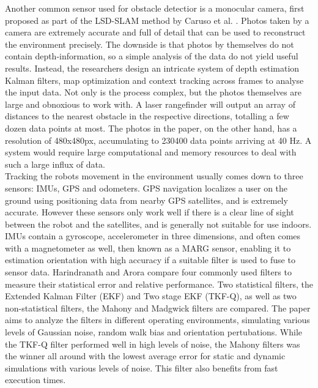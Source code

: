 Another common sensor used for obstacle detectior is a monocular camera, first proposed as part of the LSD-SLAM method by Caruso et al. \cite{7353366}. Photos taken by a camera are extremely accurate and full of detail that can be used to reconstruct the environment precisely. The downside is that photos by themselves do not contain depth-information, so a simple analysis of the data do not yield useful results. Instead, the researchers design an intricate system of depth estimation Kalman filters, map optimization and context tracking across frames to analyse the input data. Not only is the process complex, but the photos themselves are large and obnoxious to work with. A laser rangefinder will output an array of distances to the nearest obstacle in the respective directions, totalling a few dozen data points at most. The photos in the paper, on the other hand, has a resolution of 480x480px, accumulating to 230400 data points arriving at 40 Hz. A system would require large computational and memory resources to deal with such a large influx of data. \\

Tracking the robots movement in the environment usually comes down to three sensors: IMUs, GPS and odometers. GPS navigation localizes a user on the ground using positioning data from nearby GPS satellites, and is extremely accurate. However these sensors only work well if there is a clear line of sight between the robot and the satellites, and is generally not suitable for use indoors. \\

IMUs contain a gyroscope, accelerometer in three dimensions, and often comes with a magnetometer as well, then known as a MARG sensor, enabling it to estimation orientation with high accuracy if a suitable filter is used to fuse to sensor data. Harindranath and Arora \cite{8904029} compare four commonly used filters to measure their statistical error and relative performance. Two statistical filters, the Extended Kalman Filter (EKF) and Two stage EKF (TKF-Q), as well as two non-statistical filters, the Mahony and Madgwick filters are compared. The paper aims to analyze the filters in different operating environments, simulating various levels of Gaussian noise, random walk bias and orientation pertubations. While the TKF-Q filter performed well in high levels of noise, the Mahony filters was the winner all around with the lowest average error for static and dynamic simulations with various levels of noise. This filter also benefits from fast execution times. \\

